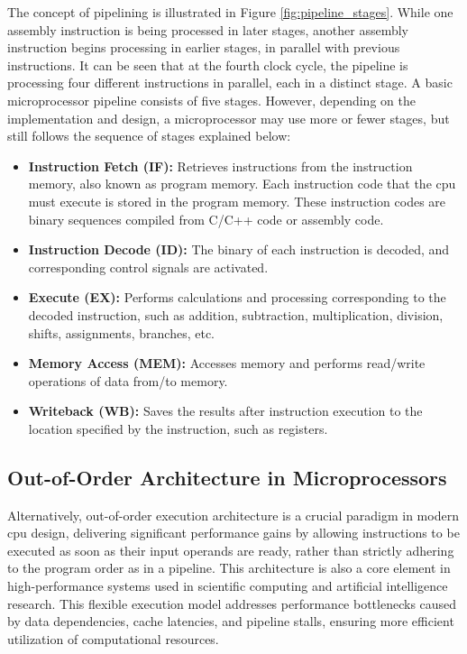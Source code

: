 The concept of pipelining is illustrated in Figure \ref{fig:pipeline_stages}. While one assembly instruction is being processed in later stages, another assembly instruction begins processing in earlier stages, in parallel with previous instructions. It can be seen that at the fourth clock cycle, the pipeline is processing four different instructions in parallel, each in a distinct stage. A basic microprocessor pipeline consists of five stages. However, depending on the implementation and design, a microprocessor may use more or fewer stages, but still follows the sequence of stages explained below:
\begin{itemize}
    \item \textbf{Instruction Fetch (IF):} Retrieves instructions from the instruction memory, also known as program memory. Each instruction code that the \acrshort{cpu} must execute is stored in the program memory. These instruction codes are binary sequences compiled from C/C++ code or assembly code.
    \item \textbf{Instruction Decode (ID):} The binary of each instruction is decoded, and corresponding control signals are activated.
    \item \textbf{Execute (EX):} Performs calculations and processing corresponding to the decoded instruction, such as addition, subtraction, multiplication, division, shifts, assignments, branches, etc.
    \item \textbf{Memory Access (MEM):} Accesses memory and performs read/write operations of data from/to memory.
    \item \textbf{Writeback (WB):} Saves the results after instruction execution to the location specified by the instruction, such as registers.
\end{itemize}

\subsection{Out-of-Order Architecture in Microprocessors}

Alternatively, out-of-order execution architecture is a crucial paradigm in modern \acrshort{cpu} design, delivering significant performance gains by allowing instructions to be executed as soon as their input operands are ready, rather than strictly adhering to the program order as in a pipeline. This architecture is also a core element in high-performance systems used in scientific computing and artificial intelligence research. This flexible execution model addresses performance bottlenecks caused by data dependencies, cache latencies, and pipeline stalls, ensuring more efficient utilization of computational resources.

